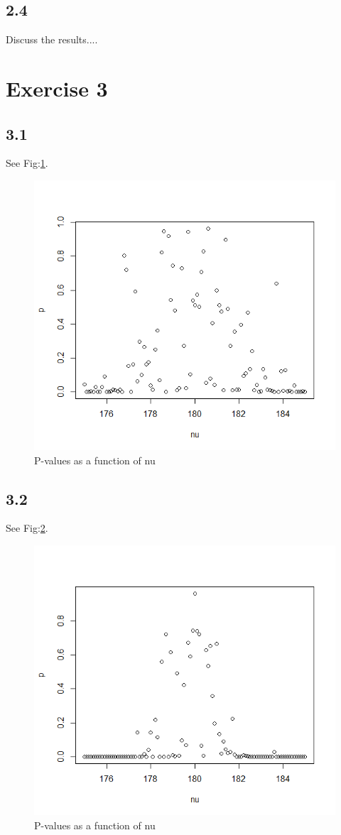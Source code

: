 \documentclass{article}
\begin{document}
    \subsection{2.4}
      Discuss the results....
      

  \section{Exercise 3}

    \subsection{3.1}
      See Fig:\ref{fig:3_1}.
      \begin{figure}
        \centering
        \includegraphics[width=.8\linewidth]{results/3_1}
        \caption{P-values as a function of nu}
        \label{fig:3_1}
      \end{figure}

    \subsection{3.2}
      See Fig:\ref{fig:3_2}.
      \begin{figure}
        \centering
        \includegraphics[width=.8\linewidth]{results/3_2}
        \caption{P-values as a function of nu}
        \label{fig:3_2}
      \end{figure}
\end{document}
